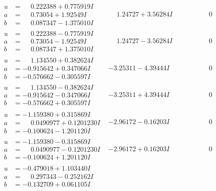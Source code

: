 \documentclass[1p]{elsarticle_modified}
\theoremstyle{definition}
\begin{document}
$$\begin{array}{c|c|c}
 \hline 
\begin{aligned}
u &= \phantom{-}0.222388 + 0.775919 I \\
a &= \phantom{-}0.73054 + 1.92549 I \\
b &= \phantom{-}0.087347 - 1.375010 I\end{aligned}
 & \phantom{-}1.24727 + 3.56284 I & \phantom{-0.000000 } 0 \\ \hline\begin{aligned}
u &= \phantom{-}0.222388 - 0.775919 I \\
a &= \phantom{-}0.73054 - 1.92549 I \\
b &= \phantom{-}0.087347 + 1.375010 I\end{aligned}
 & \phantom{-}1.24727 - 3.56284 I & \phantom{-0.000000 } 0 \\ \hline\begin{aligned}
u &= \phantom{-}1.134550 + 0.382624 I \\
a &= -0.915642 + 0.347066 I \\
b &= -0.576662 - 0.305597 I\end{aligned}
 & -3.25311 - 4.39444 I & \phantom{-0.000000 } 0 \\ \hline\begin{aligned}
u &= \phantom{-}1.134550 - 0.382624 I \\
a &= -0.915642 - 0.347066 I \\
b &= -0.576662 + 0.305597 I\end{aligned}
 & -3.25311 + 4.39444 I & \phantom{-0.000000 } 0 \\ \hline\begin{aligned}
u &= -1.159380 + 0.315869 I \\
a &= \phantom{-}0.0490977 + 0.1201230 I \\
b &= -0.100624 - 1.201120 I\end{aligned}
 & -2.96172 - 0.16203 I & \phantom{-0.000000 } 0 \\ \hline\begin{aligned}
u &= -1.159380 - 0.315869 I \\
a &= \phantom{-}0.0490977 - 0.1201230 I \\
b &= -0.100624 + 1.201120 I\end{aligned}
 & -2.96172 + 0.16203 I & \phantom{-0.000000 } 0 \\ \hline\begin{aligned}
u &= -0.479018 + 1.103440 I \\
a &= \phantom{-}0.297343 - 0.252162 I \\
b &= -0.132709 + 0.061105 I\end{aligned}

\end{array}$$
\end{document}
